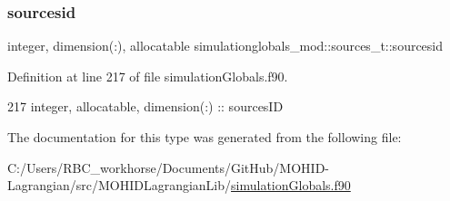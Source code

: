 \subsubsection{\texorpdfstring{sourcesid}{sourcesid}}
{\footnotesize\ttfamily integer, dimension(\+:), allocatable simulationglobals\+\_\+mod\+::sources\+\_\+t\+::sourcesid\hspace{0.3cm}{\ttfamily [private]}}



Definition at line 217 of file simulation\+Globals.\+f90.


\begin{DoxyCode}
217         \textcolor{keywordtype}{integer}, \textcolor{keywordtype}{allocatable}, \textcolor{keywordtype}{dimension(:)} :: sourcesID
\end{DoxyCode}


The documentation for this type was generated from the following file\+:\begin{DoxyCompactItemize}
\item 
C\+:/\+Users/\+R\+B\+C\+\_\+workhorse/\+Documents/\+Git\+Hub/\+M\+O\+H\+I\+D-\/\+Lagrangian/src/\+M\+O\+H\+I\+D\+Lagrangian\+Lib/\mbox{\hyperlink{simulation_globals_8f90}{simulation\+Globals.\+f90}}\end{DoxyCompactItemize}
